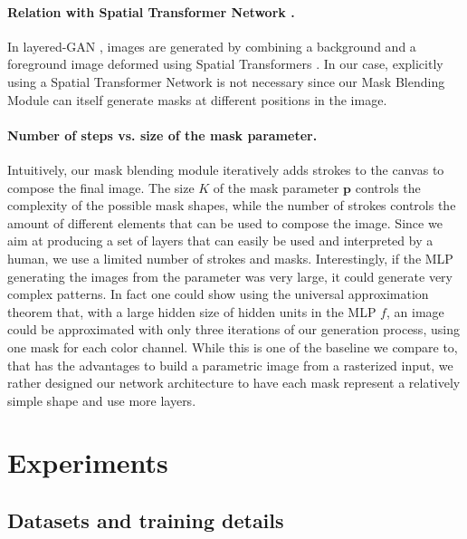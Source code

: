 \documentclass[10pt,twocolumn,letterpaper]{article}
\begin{document}
\paragraph{Relation with Spatial Transformer Network \cite{Jaderberg2015STN}.}
In layered-GAN \cite{Yang2017LRGAN}, images are generated by combining a background and a foreground image deformed using Spatial Transformers \cite{Jaderberg2015STN}. In our case, explicitly using a Spatial Transformer Network is not necessary since our Mask Blending Module can itself generate masks at different positions in the image. %

\paragraph{Number of steps vs. size of the mask parameter.} Intuitively, our mask blending module iteratively adds strokes to the canvas to compose the final image. The size $K$ of the mask parameter $\mathbf{p}$ controls the complexity of the possible mask shapes, while the number of strokes controls the amount of different elements that can be used to compose the image. Since we aim at producing a set of layers that can easily be used and interpreted by a human, we use a limited number of strokes and masks. %
Interestingly, if the MLP generating the images from the parameter was very large, it could generate very complex patterns. In fact one could show using the universal approximation theorem \cite{cybenko1989approximation,hornik1991approximation} that, with a large hidden size of hidden units in the MLP $f$, an image could be approximated with only three iterations of our generation process, using one mask for each color channel. While this is one of the baseline we compare to, that has the advantages to build a parametric image from a rasterized input, we rather designed our network architecture to have each mask represent a relatively simple shape and use more layers.


\section{Experiments}

\subsection{Datasets and training details}
\end{document}
